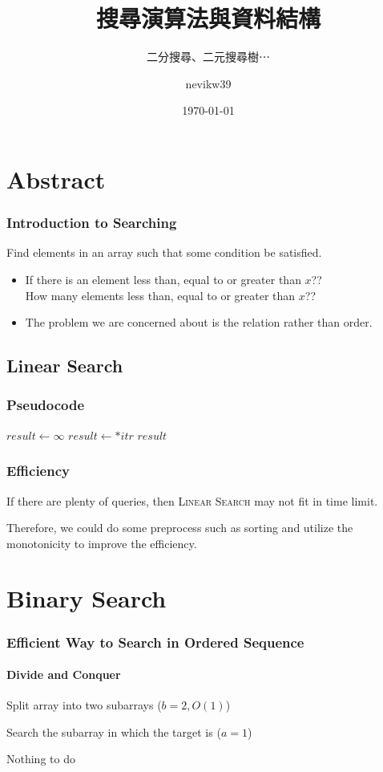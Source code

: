 \documentclass{beamer}
\title{搜尋演算法與資料結構}
\subtitle{二分搜尋、二元搜尋樹⋯}
\author{nevikw39}
\institute{點石學園}
\date{\today}
\begin{document}
\frame{\titlepage}

\frame{\tableofcontents}

\section{Abstract}

\frame
{
	\frametitle{Introduction to Searching}
	
	\begin{definition}[Search]
		Find elements in an array such that some condition be satisfied.
	\end{definition}
	
	\pause
	
	\begin{itemize}
		\item If there is an element less than, equal to or greater than $x$??\\
		How many elements less than, equal to or greater than $x$??\pause
		\item The problem we are concerned about is the relation rather than order.
	\end{itemize}
}

\subsection{Linear Search}

\frame
{
	\frametitle{Pseudocode}
	
	\begin{algorithmic}
			\State$result\gets\infty$
            \For{$itr\in[begin, end)$}
					\State$result\gets *itr$
				\EndIf
            \EndFor
            \State\Return$result$
        \EndProcedure
	\end{algorithmic}
}

\frame
{
	\frametitle{Efficiency}
	
	If there are plenty of queries, then \textsc{Linear Search} may not fit in time limit.\pause
	
	Therefore, we could do some preprocess such as sorting and utilize the monotonicity to improve the efficiency.
}

\section{Binary Search}

\frame
{
	\frametitle{Efficient Way to Search in Ordered Sequence}
	\framesubtitle{Divide and Conquer}
	
	\begin{description}
		\item<1->[Divide]Split array into two subarrays ($b = 2, O(1)$)
		\item<2->[Conquer]Search the subarray in which the target is ($a = 1$)
		\item<3->[Combine]Nothing to do
	\end{description}
}
\end{document}
